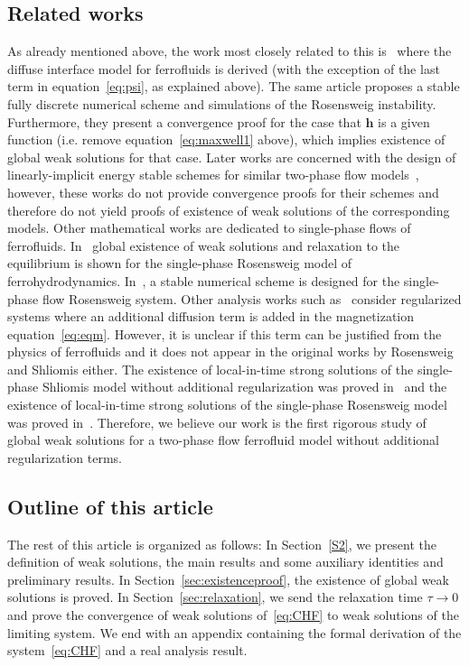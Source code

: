 \documentclass[10pt,letterpaper,twoside]{amsart}
\theoremstyle{definition}{\newtheorem{definition}[lemma]{Definition}}
\theoremstyle{note}{\newtheorem{claim}{Claim}[section]
\newtheorem*{claim*}{Claim}}
\numberwithin{equation}{section}
\newcommand{\bh}{\mathbf{h}}
\begin{document}
\subsection{Related works}
As already mentioned above, the work most closely related to this is~\cite{Nochetto2016b} where the diffuse interface model for ferrofluids is derived (with the exception of the last term in equation~\eqref{eq:psi}, as explained above). The same article proposes a stable fully discrete numerical scheme and simulations of the Rosensweig instability. Furthermore, they present a convergence proof for the case that $\bh$ is a given function (i.e. remove equation~\eqref{eq:maxwell1} above), which implies existence of global weak solutions for that case. Later works are concerned with the design of linearly-implicit energy stable schemes for similar two-phase flow models~\cite{Keram2025,Zhang2021,Zhang2024}, however, these works do not provide convergence proofs for their schemes and therefore do not yield proofs of existence of weak solutions of the corresponding models.
Other mathematical works are dedicated to single-phase flows of ferrofluids. In~\cite{Nochetto2019} global existence of weak solutions and relaxation to the equilibrium is shown for the single-phase Rosensweig model of ferrohydrodynamics.  In~\cite{Nochetto2016}, a stable numerical scheme is designed for the single-phase flow Rosensweig system. Other analysis works such as~\cite{Amirat2008,Scrobogna2019} consider regularized systems where an additional diffusion term is added in the magnetization equation~\eqref{eq:eqm}. However, it is unclear if this term can be justified from the physics of ferrofluids and it does not appear in the original works by Rosensweig and Shliomis either. The existence of local-in-time strong solutions of the single-phase Shliomis model without additional regularization was proved in~\cite{Amirat2009} and the existence of local-in-time strong solutions of the single-phase Rosensweig model was proved in~\cite{Amirat2010}.
Therefore, we believe our work is the first rigorous study of global weak solutions for a two-phase flow ferrofluid model without additional regularization terms. 
\subsection{Outline of this article}
The rest of this article is organized as follows: In Section~\ref{S2}, we present the definition of weak solutions, the main results and some auxiliary identities and preliminary results. In Section~\ref{sec:existenceproof}, the existence of global weak solutions is proved. In Section~\ref{sec:relaxation}, we send the relaxation time $\tau\to 0$ and prove the convergence of weak solutions of~\eqref{eq:CHF} to weak solutions of the limiting system. We end with an appendix containing the formal derivation of the system~\eqref{eq:CHF} and a real analysis result.
\end{document}
